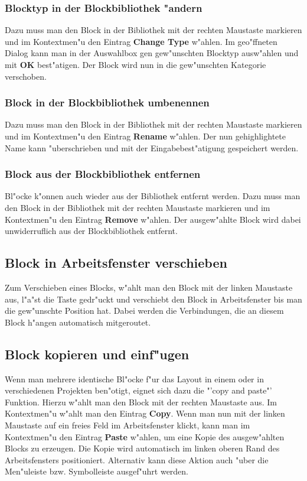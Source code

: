 \documentclass[a4paper,titlepage,12pt,ngerman]{scrbook}
\begin{document}
\subsubsection{Blocktyp in der Blockbibliothek "andern}
Dazu muss man den Block in der Bibliothek mit der rechten Maustaste markieren und im Kontextmen"u den Eintrag {\bf Change Type} w"ahlen. Im geo"ffneten Dialog kann man in der Auswahlbox gen gew"unschten Blocktyp ausw"ahlen und mit {\bf OK} best"atigen. Der Block wird nun in die gew"unschten Kategorie verschoben.
\subsubsection{Block in der Blockbibliothek umbenennen}
Dazu muss man den Block in der Bibliothek mit der rechten Maustaste markieren und im Kontextmen"u den Eintrag {\bf Rename} w"ahlen. Der nun gehighlightete Name kann "uberschrieben und mit der Eingabebest"atigung gespeichert werden.
\subsubsection{Block aus der Blockbibliothek entfernen}
Bl"ocke k"onnen auch wieder aus der Bibliothek entfernt werden. Dazu muss man den
Block in der Bibliothek mit der rechten Maustaste markieren und im Kontextmen"u den
Eintrag {\bf Remove} w"ahlen. Der ausgew"ahlte Block wird dabei unwiderruflich aus der Blockbibliothek entfernt.

\subsection{Block in Arbeitsfenster verschieben}
Zum Verschieben eines Blocks, w"ahlt man den Block mit der linken Maustaste aus, l"a"st die Taste gedr"uckt und verschiebt den Block in Arbeitsfenster bis man die gew"unschte Position hat. Dabei werden die Verbindungen, die an diesem Block h"angen automatisch mitgeroutet.


\subsection{Block kopieren und einf"ugen}
Wenn man mehrere identische Bl"ocke f"ur das Layout in einem oder in verschiedenen Projekten ben"otigt, eignet sich dazu die "'copy and paste"' Funktion. Hierzu w"ahlt man den Block mit der rechten Maustaste aus. Im Kontextmen"u w"ahlt man den Eintrag {\bf Copy}. Wenn man nun mit der linken Maustaste auf ein freies Feld im Arbeitsfenster klickt, kann man im Kontextmen"u den Eintrag {\bf Paste} w"ahlen, um eine Kopie des ausgew"ahlten Blocks zu erzeugen.
Die Kopie wird automatisch im linken oberen Rand des Arbeitsfensters positioniert.\newline
Alternativ kann diese Aktion auch "uber die Men"uleiste bzw. Symbolleiste ausgef"uhrt werden.
\end{document}
